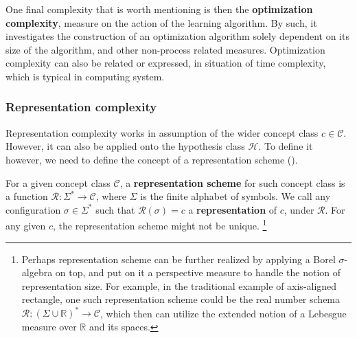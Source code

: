 \documentclass[10pt]{article}
\begin{document}
One final complexity that is worth mentioning is then the \textbf{optimization complexity}, measure on the action of the learning algorithm. By such, it investigates the construction of an optimization algorithm solely dependent on its size of the algorithm, and other non-process related measures. Optimization complexity can also be related or expressed, in situation of time complexity, which is typical in computing system. 

\subsubsection{Representation complexity}

Representation complexity works in assumption of the wider concept class $c\in \mathcal{C}$. However, it can also be applied onto the hypothesis class $\mathcal{H}$. To define it however, we need to define the concept of a representation scheme (\cite{10.5555/200548}). 

\begin{definition}
    For a given concept class $\mathcal{C}$, a \textbf{representation scheme} for such concept class is a function $\mathcal{R}: \Sigma^{*}\to \mathcal{C}$, where $\Sigma$ is the finite alphabet of symbols. We call any configuration $\sigma \in \Sigma^{*}$ such that $\mathcal{R}(\sigma)=c$ a \textbf{representation} of $c$, under $\mathcal{R}$. For any given $c$, the representation scheme might not be unique. \footnote{Perhaps representation scheme can be further realized by applying a Borel $\sigma$-algebra on top, and put on it a perspective measure to handle the notion of representation size. For example, in the traditional example of axis-aligned rectangle, one such representation scheme could be the real number schema $\mathcal{R}:(\Sigma \cup \mathbb{R})^{*}\to \mathcal{C}$, which then can utilize the extended notion of a Lebesgue measure over $\mathbb{R}$ and its spaces.}
\end{definition} 
\end{document}
